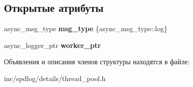 \subsection*{Открытые атрибуты}
\begin{DoxyCompactItemize}
\item 
\mbox{\label{structspdlog_1_1details_1_1async__msg_a02c7d8e28bc720dea6552042801a86c0}} 
async\+\_\+msg\+\_\+type {\bfseries msg\+\_\+type} \{async\+\_\+msg\+\_\+type\+::log\}
\item 
\mbox{\label{structspdlog_1_1details_1_1async__msg_a11f8ca9e84e22b61fca4cd7fe88db5aa}} 
async\+\_\+logger\+\_\+ptr {\bfseries worker\+\_\+ptr}
\end{DoxyCompactItemize}


Объявления и описания членов структуры находятся в файле\+:\begin{DoxyCompactItemize}
\item 
inc/spdlog/details/thread\+\_\+pool.\+h\end{DoxyCompactItemize}
